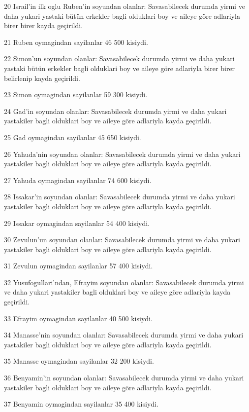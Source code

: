 \par 20 Israil'in ilk oglu Ruben'in soyundan olanlar: Savasabilecek durumda yirmi ve daha yukari yastaki bütün erkekler bagli olduklari boy ve aileye göre adlariyla birer birer kayda geçirildi.
\par 21 Ruben oymagindan sayilanlar 46 500 kisiydi.
\par 22 Simon'un soyundan olanlar: Savasabilecek durumda yirmi ve daha yukari yastaki bütün erkekler bagli olduklari boy ve aileye göre adlariyla birer birer belirlenip kayda geçirildi.
\par 23 Simon oymagindan sayilanlar 59 300 kisiydi.
\par 24 Gad'in soyundan olanlar: Savasabilecek durumda yirmi ve daha yukari yastakiler bagli olduklari boy ve aileye göre adlariyla kayda geçirildi.
\par 25 Gad oymagindan sayilanlar 45 650 kisiydi.
\par 26 Yahuda'nin soyundan olanlar: Savasabilecek durumda yirmi ve daha yukari yastakiler bagli olduklari boy ve aileye göre adlariyla kayda geçirildi.
\par 27 Yahuda oymagindan sayilanlar 74 600 kisiydi.
\par 28 Issakar'in soyundan olanlar: Savasabilecek durumda yirmi ve daha yukari yastakiler bagli olduklari boy ve aileye göre adlariyla kayda geçirildi.
\par 29 Issakar oymagindan sayilanlar 54 400 kisiydi.
\par 30 Zevulun'un soyundan olanlar: Savasabilecek durumda yirmi ve daha yukari yastakiler bagli olduklari boy ve aileye göre adlariyla kayda geçirildi.
\par 31 Zevulun oymagindan sayilanlar 57 400 kisiydi.
\par 32 Yusufogullari'ndan, Efrayim soyundan olanlar: Savasabilecek durumda yirmi ve daha yukari yastakiler bagli olduklari boy ve aileye göre adlariyla kayda geçirildi.
\par 33 Efrayim oymagindan sayilanlar 40 500 kisiydi.
\par 34 Manasse'nin soyundan olanlar: Savasabilecek durumda yirmi ve daha yukari yastakiler bagli olduklari boy ve aileye göre adlariyla kayda geçirildi.
\par 35 Manasse oymagindan sayilanlar 32 200 kisiydi.
\par 36 Benyamin'in soyundan olanlar: Savasabilecek durumda yirmi ve daha yukari yastakiler bagli olduklari boy ve aileye göre adlariyla kayda geçirildi.
\par 37 Benyamin oymagindan sayilanlar 35 400 kisiydi.
